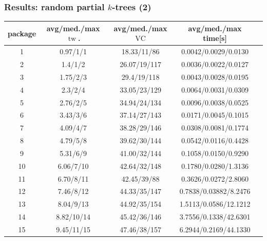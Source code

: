 \documentclass[11pt]{beamer}
\DeclareMathOperator{\tw}{tw}
\DeclareMathOperator{\VC}{VC}
\begin{document}
\begin{frame}
\frametitle{Results: random partial $k$-trees (2)}

\begin{center}
\footnotesize
\begin{table}[h!]
\centering
\begin{tabular}{|c|c|c|c|c|}
\hline
package & avg/med./max $\tw$. & avg/med./max $\VC$ & avg/med./max time[s] \\
\hline \hline
1 & 0.97/1/1 & 18.33/11/86 & 0.0042/0.0029/0.0130 \\
\hline
2 & 1.4/1/2 & 26.07/19/117 & 0.0036/0.0022/0.0127 \\
\hline
3 & 1.75/2/3 & 29.4/19/118 & 0.0043/0.0028/0.0195 \\
\hline
4 & 2.3/2/4 & 33.05/23/129 & 0.0064/0.0031/0.0309 \\
\hline
5 & 2.76/2/5 & 34.94/24/134 & 0.0096/0.0038/0.0525 \\
\hline
6 & 3.43/3/6 & 37.14/27/143 & 0.0171/0.0045/0.1015 \\
\hline
7 & 4.09/4/7 & 38.28/29/146 & 0.0308/0.0081/0.1774 \\
\hline
8 & 4.79/5/8 & 39.62/30/144 & 0.0542/0.0116/0.4428 \\
\hline
9 & 5.31/6/9 & 41.00/32/144 & 0.1058/0.0150/0.9290 \\
\hline
10 & 6.06/7/10 & 42.64/32/148 & 0.1780/0.0280/1.3136 \\
\hline
11 & 6.70/8/11 & 42.45/39/88 & 0.3626/0.0272/2.8060 \\
\hline
12 & 7.46/8/12 & 44.33/35/147 & 0.7838/0.03882/8.2476 \\
\hline
13 & 8.04/9/13 & 44.92/35/154 & 1.5113/0.0586/12.1212 \\
\hline
14 & 8.82/10/14 & 45.42/36/146 & 3.7556/0.1338/42.6301 \\
\hline
15 & 9.45/11/15 & 47.46/38/157 & 6.2944/0.2169/44.1330 \\
\hline
\end{tabular}
\end{table}
\end{center}

\end{frame}
\end{document}
